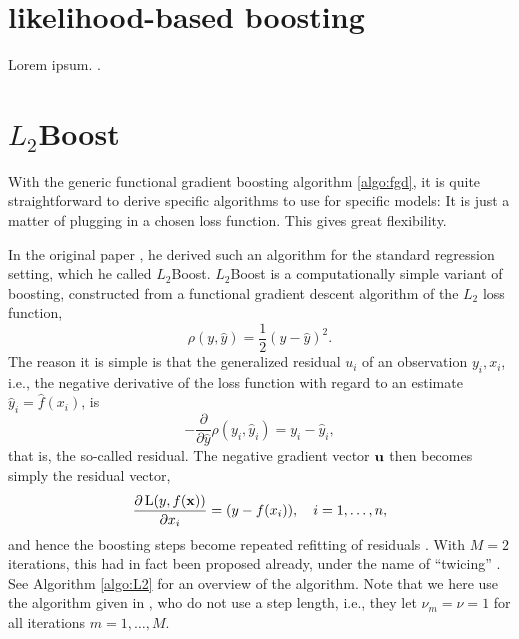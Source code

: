 \section{likelihood-based boosting}
Lorem ipsum. \citep{DeBin2016} \citep{gamboost}.

\section{$L_2$Boost}
With the generic functional gradient boosting algorithm \eqref{algo:fgd}, it is quite straightforward to derive specific algorithms to use for specific models: It is just a matter of plugging in a chosen loss function. This gives great flexibility.

In the original paper \citep{friedman2001}, he derived such an algorithm for the standard regression setting, which he called $L_2$Boost. $L_2$Boost is a computationally simple variant of boosting, constructed from a functional gradient descent algorithm of the $L_2$ loss function,
\begin{equation*}
    \rho(y, \hat{y})=\frac{1}{2}(y-\hat{y})^2.
\end{equation*}
The reason it is simple is that the generalized residual $u_i$ of an observation $y_i,x_i$, i.e., the negative derivative of the loss function with regard to an estimate $\hat{y}_i=\hat{f}(x_i)$, is
\begin{equation*}
    -\frac{\partial}{\partial\hat{y}}\rho(y_i, \hat{y}_i)=y_i-\hat{y}_i,
\end{equation*}
that is, the so-called residual. The negative gradient vector $\mathbf{u}$ then becomes simply the residual vector,
\begin{equation*}
    \frac{\partial\operatorname{L}(y,f(\mathbf{x}))}{\partial x_i}=(y-f(x_i)),\quad i=1,\dotsc,n,
\end{equation*}
and hence the boosting steps become repeated refitting of residuals \citep{friedman2001,buhlmann-yu}. With $M=2$ iterations, this had in fact been proposed already, under the name of ``twicing'' \citep{tukey}. See Algorithm \ref{algo:L2} for an overview of the algorithm. Note that we here use the algorithm given in \citet{buhlmann-yu}, who do not use a step length, i.e., they let $\nu_m=\nu=1$ for all iterations $m=1,\ldots,M$.
